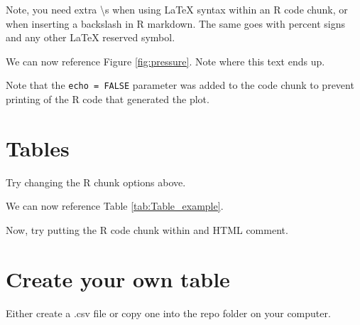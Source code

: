 \documentclass[12pt,]{article}
\begin{document}
Note, you need extra \textbackslash{}s when using LaTeX syntax within an
R code chunk, or when inserting a backslash in R markdown. The same goes
with percent signs and any other LaTeX reserved symbol.

\FloatBarrier

We can now reference Figure \ref{fig:pressure}. Note where this text
ends up.

Note that the \texttt{echo\ =\ FALSE} parameter was added to the code
chunk to prevent printing of the R code that generated the plot.

\section{Tables}\label{tables}

\begin{table}[ht]
\centering
\caption{This is where you write your caption} 
\label{tab:Table_example}
\end{table}

Try changing the R chunk options above.

We can now reference Table \ref{tab:Table_example}.

Now, try putting the R code chunk within and HTML comment.

\section{Create your own table}\label{create-your-own-table}

Either create a .csv file or copy one into the repo folder on your
computer.
\end{document}
